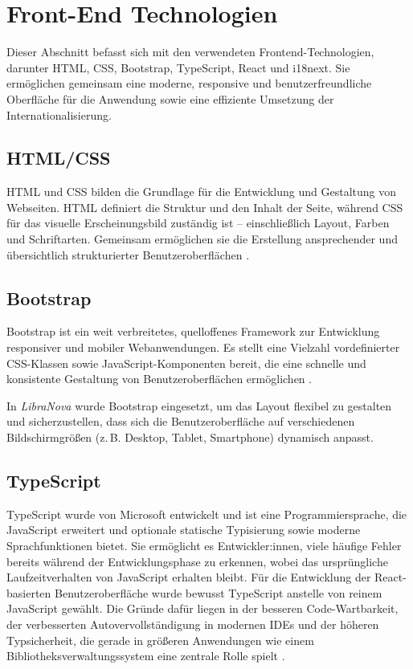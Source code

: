 \section{Front-End Technologien}
Dieser Abschnitt befasst sich mit den verwendeten Frontend-Technologien, darunter HTML, CSS, Bootstrap, TypeScript, React und i18next. Sie ermöglichen gemeinsam eine moderne, responsive und benutzerfreundliche Oberfläche für die Anwendung sowie eine effiziente Umsetzung der Internationalisierung.


\subsection{HTML/CSS}
HTML und CSS bilden die Grundlage für die Entwicklung und Gestaltung von Webseiten. HTML definiert die Struktur und den Inhalt der Seite, während CSS für das visuelle Erscheinungsbild zuständig ist – einschließlich Layout, Farben und Schriftarten. Gemeinsam ermöglichen sie die Erstellung ansprechender und übersichtlich strukturierter Benutzeroberflächen \cite{HTMLCSS2025a, HTMLCSS2025b}.

\subsection{Bootstrap}
Bootstrap ist ein weit verbreitetes, quelloffenes Framework zur Entwicklung responsiver und mobiler Webanwendungen. Es stellt eine Vielzahl vordefinierter CSS-Klassen sowie JavaScript-Komponenten bereit, die eine schnelle und konsistente Gestaltung von Benutzeroberflächen ermöglichen \cite{BOOTSTRAP2025}. 

\noindent In \textit{LibraNova} wurde Bootstrap eingesetzt, um das Layout flexibel zu gestalten und sicherzustellen, dass sich die Benutzeroberfläche auf verschiedenen Bildschirmgrößen (z.\,B. Desktop, Tablet, Smartphone) dynamisch anpasst. 

\subsection{TypeScript}
TypeScript wurde von Microsoft entwickelt und ist eine Programmiersprache, die JavaScript erweitert und optionale statische Typisierung sowie moderne Sprachfunktionen bietet. Sie ermöglicht es Entwickler:innen, viele häufige Fehler bereits während der Entwicklungsphase zu erkennen, wobei das ursprüngliche Laufzeitverhalten von JavaScript erhalten bleibt. Für die Entwicklung der React-basierten Benutzeroberfläche wurde bewusst TypeScript anstelle von reinem JavaScript gewählt. Die Gründe dafür liegen in der besseren Code-Wartbarkeit, der verbesserten Autovervollständigung in modernen IDEs und der höheren Typsicherheit, die gerade in größeren Anwendungen wie einem Bibliotheksverwaltungssystem eine zentrale Rolle spielt \cite{MICROSOFT2025, TYPESCRIPT2025}.



